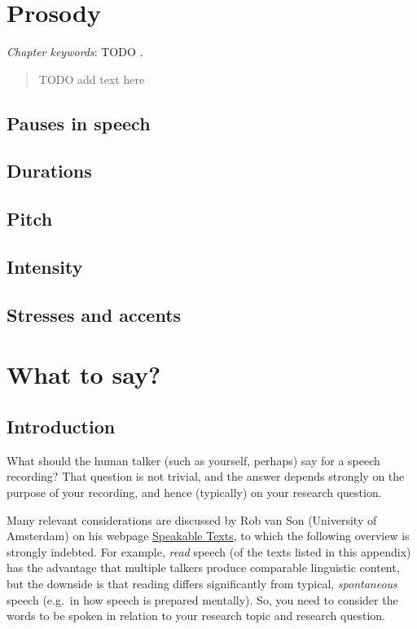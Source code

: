 \documentclass[
]{book}
\begin{document}
\chapter{Prosody}\label{ch-prosody}

\emph{Chapter keywords}: TODO .

\begin{quote}
TODO add text here
\end{quote}

\section{Pauses in speech}\label{pauses-in-speech}

\section{Durations}\label{durations}

\section{Pitch}\label{pitch}

\section{Intensity}\label{intensity}

\section{Stresses and accents}\label{stresses-and-accents}

\appendix


\chapter{What to say?}\label{app-saywhat}

\section{Introduction}\label{introduction-1}

What should the human talker (such as yourself, perhaps) say for a speech recording? That question is not trivial, and the answer depends strongly on the purpose of your recording, and hence (typically) on your research question.

Many relevant considerations are discussed by Rob van Son (University of Amsterdam) on his webpage \href{https://www.fon.hum.uva.nl/rob/SpeakableTexts.html}{Speakable Texts}, to which the following overview is strongly indebted.
For example, \emph{read} speech (of the texts listed in this appendix) has the advantage that multiple talkers produce comparable linguistic content, but the downside is that reading differs significantly from typical, \emph{spontaneous} speech (e.g.~in how speech is prepared mentally). So, you need to consider the words to be spoken in relation to your research topic and research question.
\end{document}

